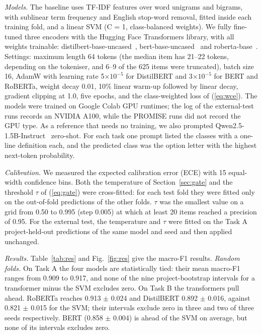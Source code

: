\documentclass[conference,10pt,letterpaper]{IEEEtran}
\begin{document}
\emph{Models.} The baseline uses TF-IDF features over word unigrams and bigrams, with sublinear term frequency and English stop-word removal, fitted inside each training fold, and a linear SVM (C = 1, class-balanced weights). We fully fine-tuned three encoders with the Hugging Face Transformers library, with all weights trainable: distilbert-base-uncased~\cite{sanh2019distilbert}, bert-base-uncased~\cite{devlin2019} and roberta-base~\cite{liu2019roberta}. Settings: maximum length 64 tokens (the median item has 21–22 tokens, depending on the tokeniser, and 6–9 of the 625 items were truncated), batch size 16, AdamW with learning rate 5$\times 10^{-5}$ for DistilBERT and 3$\times 10^{-5}$ for BERT and RoBERTa, weight decay 0.01, 10\% linear warm-up followed by linear decay, gradient clipping at 1.0, five epochs, and the class-weighted loss of (\ref{eq:wce}). The models were trained on Google Colab GPU runtimes; the log of the external-test runs records an NVIDIA A100, while the PROMISE runs did not record the GPU type. As a reference that needs no training, we also prompted Qwen2.5-1.5B-Instruct~\cite{qwen2024} zero-shot. For each task one prompt listed the classes with a one-line definition each, and the predicted class was the option letter with the highest next-token probability.

\emph{Calibration.} We measured the expected calibration error (ECE) with 15 equal-width confidence bins. Both the temperature of Section~\ref{sec:gate} and the threshold $\tau$ of (\ref{eq:gate}) were cross-fitted: for each test fold they were fitted only on the out-of-fold predictions of the other folds. $\tau$ was the smallest value on a grid from 0.50 to 0.995 (step 0.005) at which at least 20 items reached a precision of 0.95. For the external test, the temperature and $\tau$ were fitted on the Task A project-held-out predictions of the same model and seed and then applied unchanged.

\emph{Results.} Table~\ref{tab:res} and Fig.~\ref{fig:res} give the macro-F1 results. \emph{Random folds.} On Task A the four models are statistically tied: their mean macro-F1 ranges from 0.909 to 0.917, and none of the nine project-bootstrap intervals for a transformer minus the SVM excludes zero. On Task B the transformers pull ahead. RoBERTa reaches 0.913 $\pm$ 0.024 and DistilBERT 0.892 $\pm$ 0.016, against 0.821 $\pm$ 0.015 for the SVM; their intervals exclude zero in three and two of three seeds respectively. BERT (0.858 $\pm$ 0.004) is ahead of the SVM on average, but none of its intervals excludes zero.
\end{document}
